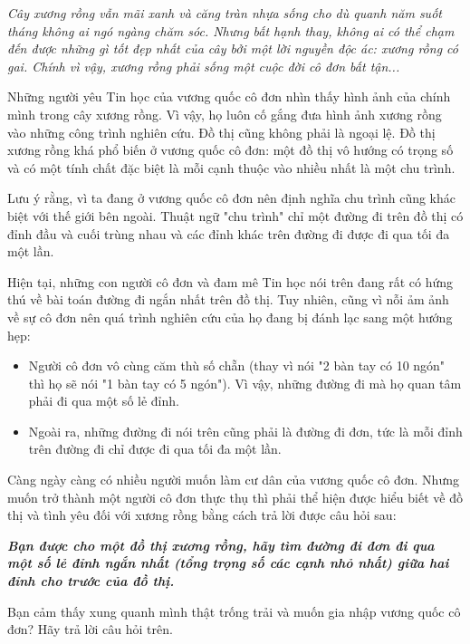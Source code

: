 



\emph{     Cây xương rồng vẫn mãi xanh và căng tràn nhựa sống cho dù quanh năm suốt tháng không ai ngó ngàng chăm sóc. Nhưng bất hạnh thay, không ai có thể chạm đến được những gì tốt đẹp nhất của cây bởi một lời nguyền độc ác: xương rồng có gai. Chính vì vậy, xương rồng phải sống một cuộc đời cô đơn bất tận...    }

   Những người yêu Tin học của vương quốc cô đơn nhìn thấy hình ảnh của chính mình trong cây xương rồng. Vì vậy, họ luôn cố gắng đưa hình ảnh xương rồng vào những công trình nghiên cứu. Đồ thị cũng không phải là ngoại lệ. Đồ thị xương rồng khá phổ biến ở vương quốc cô đơn: một đồ thị vô hướng có trọng số và có một tính chất đặc biệt là mỗi cạnh thuộc vào nhiều nhất là một chu trình.  

   Lưu ý rằng, vì ta đang ở vương quốc cô đơn nên định nghĩa chu trình cũng khác biệt với thế giới bên ngoài. Thuật ngữ "chu trình" chỉ một đường đi trên đồ thị có đỉnh đầu và cuối trùng nhau và các đỉnh khác trên đường đi được đi qua tối đa một lần.  

   Hiện tại, những con người cô đơn và đam mê Tin học nói trên đang rất có hứng thú về bài toán đường đi ngắn nhất trên đồ thị. Tuy nhiên, cũng vì nỗi ảm ảnh về sự cô đơn nên quá trình nghiên cứu của họ đang bị đánh lạc sang một hướng hẹp:  
\begin{itemize}
	\item     Người cô đơn vô cùng căm thù số chẵn (thay vì nói "2 bàn tay có 10 ngón" thì họ sẽ nói "1 bàn tay có 5 ngón"). Vì vậy, những đường đi mà họ quan tâm phải đi qua một số lẻ đỉnh.   
	\item     Ngoài ra, những đường đi nói trên cũng phải là đường đi đơn, tức là mỗi đỉnh trên đường đi chỉ được đi qua tối đa một lần.   
\end{itemize}

   Càng ngày càng có nhiều người muốn làm cư dân của vương quốc cô đơn. Nhưng muốn trở thành một người cô đơn thực thụ thì phải thể hiện được hiểu biết về đồ thị và tình yêu đối với xương rồng bằng cách trả lời được câu hỏi sau:  

\textbf{\emph{     Bạn được cho một đồ thị xương rồng, hãy tìm đường đi đơn đi qua một số lẻ đỉnh ngắn nhất (tổng trọng số các cạnh nhỏ nhất) giữa hai đỉnh cho trước của đồ thị.    }}

   Bạn cảm thấy xung quanh mình thật trống trải và muốn gia nhập vương quốc cô đơn? Hãy trả lời câu hỏi trên.  

